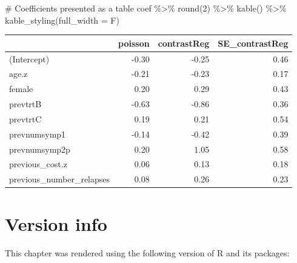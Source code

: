 \documentclass[
  letterpaper,
  DIV=11,
  numbers=noendperiod]{scrreprt}
\newenvironment{Shaded}{\begin{snugshade}}{\end{snugshade}}
\newcommand{\AttributeTok}[1]{\textcolor[rgb]{0.40,0.45,0.13}{#1}}
\newcommand{\CommentTok}[1]{\textcolor[rgb]{0.37,0.37,0.37}{#1}}
\newcommand{\DecValTok}[1]{\textcolor[rgb]{0.68,0.00,0.00}{#1}}
\newcommand{\FunctionTok}[1]{\textcolor[rgb]{0.28,0.35,0.67}{#1}}
\newcommand{\NormalTok}[1]{\textcolor[rgb]{0.00,0.23,0.31}{#1}}
\newcommand{\SpecialCharTok}[1]{\textcolor[rgb]{0.37,0.37,0.37}{#1}}
\begin{document}
\begin{Shaded}
\begin{Highlighting}[]
\CommentTok{\# Coefficients presented as a table}
\NormalTok{coef }\SpecialCharTok{\%\textgreater{}\%} \FunctionTok{round}\NormalTok{(}\DecValTok{2}\NormalTok{) }\SpecialCharTok{\%\textgreater{}\%} \FunctionTok{kable}\NormalTok{() }\SpecialCharTok{\%\textgreater{}\%} \FunctionTok{kable\_styling}\NormalTok{(}\AttributeTok{full\_width =}\NormalTok{ F)}
\end{Highlighting}
\end{Shaded}

\begin{table}
\centering
\begin{tabular}{l|r|r|r}
\hline
  & poisson & contrastReg & SE\_contrastReg\\
\hline
(Intercept) & -0.30 & -0.25 & 0.46\\
\hline
age.z & -0.21 & -0.23 & 0.17\\
\hline
female & 0.20 & 0.29 & 0.43\\
\hline
prevtrtB & -0.63 & -0.86 & 0.36\\
\hline
prevtrtC & 0.19 & 0.21 & 0.54\\
\hline
prevnumsymp1 & -0.14 & -0.42 & 0.39\\
\hline
prevnumsymp2p & 0.20 & 1.05 & 0.58\\
\hline
previous\_cost.z & 0.06 & 0.13 & 0.18\\
\hline
previous\_number\_relapses & 0.08 & 0.26 & 0.23\\
\hline
\end{tabular}
\end{table}

\hypertarget{version-info-7}{%
\section*{Version info}\label{version-info-7}}


This chapter was rendered using the following version of R and its
packages:
\end{document}

